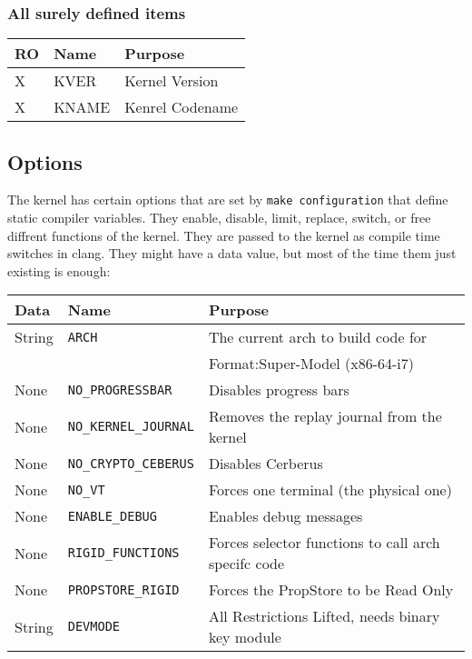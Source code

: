 \documentclass[12pt]{article}
\begin{document}
\subsubsection{All surely defined items}

\begin{tabular}{lll}
\hline
RO & Name & Purpose \\
\hline
X & KVER & Kernel Version  \\
X & KNAME & Kenrel Codename \\
\hline
\end{tabular}
\subsection{Options}
The kernel has certain options that are set by \verb+make configuration+ that define static compiler variables. They enable, disable, limit, replace, switch, or free diffrent functions of the kernel. They are passed to the kernel as compile time switches in clang. They might have a data value, but most of the time them just existing is enough:

\begin{tabular}{|l|l|l|}
\hline
Data & Name & Purpose \\
\hline

String & \verb+ARCH+ & The current arch to build code for \\
 & & Format:Super-Model (x86-64-i7) \\
\hline

None & \verb+NO_PROGRESSBAR+ & Disables progress bars  \\
\hline

None & \verb+NO_KERNEL_JOURNAL+ & Removes the replay journal from the kernel \\
\hline

None & \verb+NO_CRYPTO_CEBERUS+ & Disables Cerberus\\
\hline

None & \verb+NO_VT+ & Forces one terminal (the physical one)\\
\hline

None & \verb+ENABLE_DEBUG+ & Enables debug messages \\
\hline

None & \verb+RIGID_FUNCTIONS+ & Forces selector functions to call arch specifc code\\
\hline

None & \verb+PROPSTORE_RIGID+ & Forces the PropStore to be Read Only\\
\hline

String & \verb+DEVMODE+ & All Restrictions Lifted, needs binary key module\\
\hline

\end{tabular}
\end{document}

